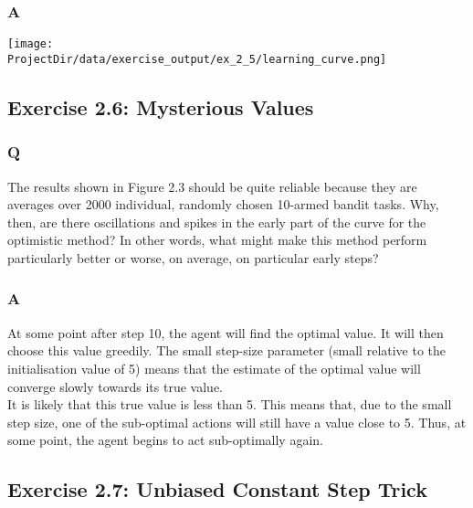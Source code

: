 \subsubsection{A}
\ProgrammingExercise

\texttt{[image: \\ProjectDir/data/exercise\_output/ex\_2\_5/learning\_curve.png]}


\subsection{Exercise 2.6: Mysterious Values}
\subsubsection{Q}
The results shown in Figure 2.3 should be quite reliable because they are averages over 2000 individual, randomly chosen 10-armed bandit tasks. Why, then, are there oscillations and spikes in the early part of the curve for the optimistic method? In other words, what might make this method perform particularly better or worse, on average, on particular early steps?

\subsubsection{A}
At some point after step 10, the agent will find the optimal value. It will then choose this value greedily. The small step-size parameter (small relative to the initialisation value of 5) means that the estimate of the optimal value will converge slowly towards its true value.\\

It is likely that this true value is less than 5. This means that, due to the small step size, one of the sub-optimal actions will still have a value close to 5. Thus, at some point, the agent begins to act sub-optimally again.

\subsection{Exercise 2.7: Unbiased Constant Step Trick}
